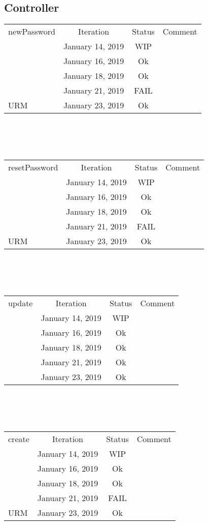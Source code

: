 \documentclass{scrreprt}
\begin{document}
\subsection{Controller}
	\begin{tabularx}{12cm}{X|c|c|c}
		newPassword & Iteration & Status & Comment  \\
		& January 14, 2019 & WIP & \\
		& January 16, 2019 & Ok & \\
		& January 18, 2019 & Ok & \\
		& January 21, 2019 & FAIL & \\ URM
		& January 23, 2019 & Ok & \\
	\end{tabularx}	
	\\ \\ \\
	\begin{tabularx}{12cm}{X|c|c|c}
		resetPassword & Iteration & Status & Comment  \\
		& January 14, 2019 & WIP & \\
		& January 16, 2019 & Ok & \\
		& January 18, 2019 & Ok & \\
		& January 21, 2019 & FAIL & \\ URM
		& January 23, 2019 & Ok & \\
	\end{tabularx}	
	\\ \\ \\
	\begin{tabularx}{12cm}{X|c|c|c}
		update & Iteration & Status & Comment  \\
		& January 14, 2019 & WIP & \\
		& January 16, 2019 & Ok & \\
		& January 18, 2019 & Ok & \\
		& January 21, 2019 & Ok & \\
		& January 23, 2019 & Ok & \\
	\end{tabularx}	
	\\ \\ \\
	\begin{tabularx}{12cm}{X|c|c|c}
		create & Iteration & Status & Comment  \\
		& January 14, 2019 & WIP & \\
		& January 16, 2019 & Ok & \\
		& January 18, 2019 & Ok & \\
		& January 21, 2019 & FAIL & \\ URM
		& January 23, 2019 & Ok & \\
	\end{tabularx}	
\end{document}
